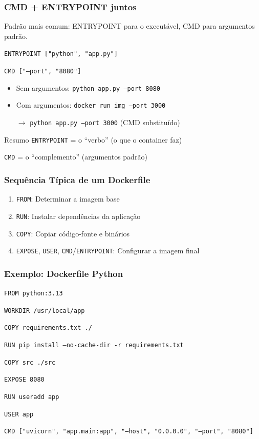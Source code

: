 \begin{frame}
  \frametitle{CMD + ENTRYPOINT juntos}
  Padrão mais comum: ENTRYPOINT para o executável, CMD para argumentos padrão.

  \vspace{0.5em}
  \texttt{ENTRYPOINT ["python", "app.py"]}

  \texttt{CMD ["--port", "8080"]}

  \vspace{0.5em}
  \begin{itemize}
    \item Sem argumentos: \texttt{python app.py --port 8080}
    \item Com argumentos: \texttt{docker run img --port 3000}

          $\rightarrow$ \texttt{python app.py --port 3000} (CMD substituído)
  \end{itemize}

  \vspace{0.5em}
  \begin{block}{Resumo}
    \texttt{ENTRYPOINT} = o ``verbo'' (o que o container faz)

    \texttt{CMD} = o ``complemento'' (argumentos padrão)
  \end{block}
\end{frame}

\begin{frame}
  \frametitle{Sequência Típica de um Dockerfile}
  \begin{enumerate}
    \item \texttt{FROM}: Determinar a imagem base
    \item \texttt{RUN}: Instalar dependências da aplicação
    \item \texttt{COPY}: Copiar código-fonte e binários
    \item \texttt{EXPOSE}, \texttt{USER}, \texttt{CMD}/\texttt{ENTRYPOINT}: Configurar a imagem final
  \end{enumerate}
\end{frame}

\begin{frame}
  \frametitle{Exemplo: Dockerfile Python}
  \texttt{FROM python:3.13}

  \texttt{WORKDIR /usr/local/app}

  \texttt{COPY requirements.txt ./}

  \texttt{RUN pip install --no-cache-dir -r requirements.txt}

  \texttt{COPY src ./src}

  \texttt{EXPOSE 8080}

  \texttt{RUN useradd app}

  \texttt{USER app}

  \texttt{CMD ["uvicorn", "app.main:app", "--host", "0.0.0.0", "--port", "8080"]}
\end{frame}

